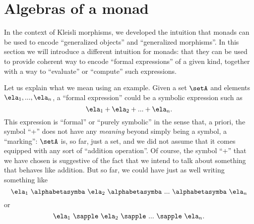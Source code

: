 

\section{Algebras of a monad}
\label{sec:Eilenberg-Moore}

In the context of Kleisli morphisms, we developed the intuition that monads can be used to encode ``generalized objects'' and ``generalized morphisms''. In this section we will introduce a different intuition for monads: that they can be used to provide coherent way to encode ``formal expressions'' of a given kind, together with a way to ``evaluate'' or ``compute'' such expressions. 

Let us explain what we mean using an example. Given a set $\setA$ and elements $\ela_1, ..., \ela_n$, a ``formal expression'' could be a symbolic expression such as 
\begin{equation}\label{eq:formal-sum}
\ela_1 + \ela_2 + ... + \ela_n.
\end{equation}
This expression is ``formal'' or ``purely symbolic'' in the sense that, a priori, the symbol ``+'' does not have any \emph{meaning} beyond simply being a symbol, a ``marking'': $\setA$ is, so far, just a set, and we did not assume that it comes equipped with any sort of ``addition operation''. Of course, the symbol ``+'' that we have chosen is suggestive of the fact that we intend to talk about something that behaves like addition. But so far, we could have just as well writing something like
\begin{equation}\label{eq:formal-zodiac-sum}
\ela_1 \  \alphabetasymba \ \ela_2 \ \alphabetasymba \ ...  \ \alphabetasymba \  \ela_n
\end{equation}
or 
\begin{equation}\label{eq:formal-apple-sum}
\ela_1 \ \sapple \ \ela_2 \ \sapple \ ... \ \sapple  \ \ela_n.
\end{equation}


